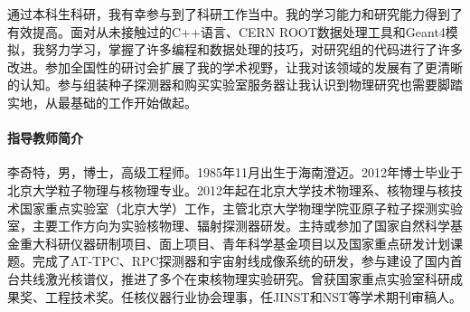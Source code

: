 \documentclass[fontset=none,zihao=-4]{ctexart}
\begin{document}
通过本科生科研，我有幸参与到了科研工作当中。我的学习能力和研究能力得到了有效提高。面对从未接触过的C++语言、CERN ROOT数据处理工具和Geant4模拟，我努力学习，掌握了许多编程和数据处理的技巧，对研究组的代码进行了许多改进。参加全国性的研讨会扩展了我的学术视野，让我对该领域的发展有了更清晰的认知。参与组装种子探测器和购买实验室服务器让我认识到物理研究也需要脚踏实地，从最基础的工作开始做起。

\paragraph*{指导教师简介}

李奇特，男，博士，高级工程师。1985年11月出生于海南澄迈。2012年博士毕业于北京大学粒子物理与核物理专业。2012年起在北京大学技术物理系、核物理与核技术国家重点实验室（北京大学）工作，主管北京大学物理学院亚原子粒子探测实验室，主要工作方向为实验核物理、辐射探测器研发。主持或参加了国家自然科学基金重大科研仪器研制项目、面上项目、青年科学基金项目以及国家重点研发计划课题。完成了AT-TPC、RPC探测器和宇宙射线成像系统的研发，参与建设了国内首台共线激光核谱仪，推进了多个在束核物理实验研究。曾获国家重点实验室科研成果奖、工程技术奖。任核仪器行业协会理事，任JINST和NST等学术期刊审稿人。
\end{document}
